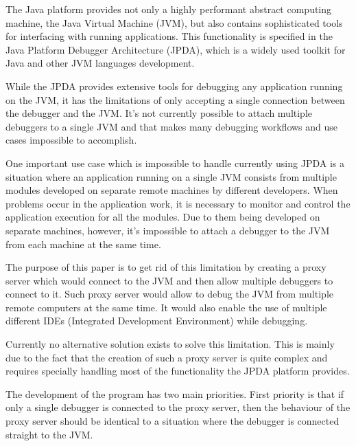 \documentclass[..thesis.tex]{subfiles}
\begin{document}
% 
% 

The Java platform provides not only a highly performant abstract computing machine, the Java Virtual Machine (JVM), but also contains sophisticated tools for interfacing with running applications. 
This functionality is specified in the Java Platform Debugger Architecture (JPDA), which is a widely used toolkit for Java and other JVM languages development.

While the JPDA provides extensive tools for debugging any application running on the JVM, it has the limitations of only accepting a single connection between the debugger and the JVM. 
It's not currently possible to attach multiple debuggers to a single JVM and that makes many debugging workflows and use cases impossible to accomplish.

One important use case which is impossible to handle currently using JPDA is a situation where an application running on a single JVM consists from multiple modules developed on separate remote machines by different developers.
When problems occur in the application work, it is necessary to monitor and control the application execution for all the modules.
Due to them being developed on separate machines, however, it's impossible to attach a debugger to the JVM from each machine at the same time. 

The purpose of this paper is to get rid of this limitation by creating a proxy server which would connect to the JVM and then allow multiple debuggers to connect to it. 
Such proxy server would allow to debug the JVM from multiple remote computers at the same time.  
It would also enable the use of multiple different IDEs (Integrated Development Environment) while debugging. 

Currently no alternative solution exists to solve this limitation.
This is mainly due to the fact that the creation of such a proxy server is quite complex and requires specially handling most of the functionality the JPDA platform provides.

The development of the program has two main priorities. 
First priority is that if only a single debugger is connected to the proxy server, then the behaviour of the proxy server should be identical to a situation where the debugger is connected straight to the JVM.
\end{document}
